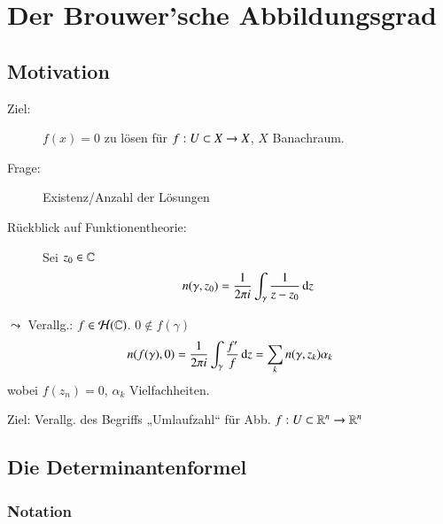 \section{Der Brouwer'sche Abbildungsgrad}

\subsection*{Motivation}
\begin{description}
    \item[Ziel:]
    $f(x)=0$ zu lösen für $f:U\subset X \rightarrow X$, $X$ Banachraum.
    \item[Frage:]
    Existenz/Anzahl der Lösungen
    \item[Rückblick auf Funktionentheorie:]
    Sei $z_0\in \mathbb{C}$
    \[
        n(\gamma,z_0) = \frac{1}{2\pi i} \int_\gamma \frac1{z-z_0} \, \mathrm{d} z
    \]
\end{description}
$\leadsto$ Verallg.: $f\in \mathcal H(\mathbb{C})$. $0\nin f(\gamma)$
\[
    n(f(\gamma),0)=\frac1{2\pi i} \int_\gamma \frac{f'}{f} \, \mathrm{d} z = \sum_k n(\gamma,z_k) \alpha_k
\]
wobei $f(z_n)=0$, $\alpha_k$ Vielfachheiten.

\noindent Ziel: Verallg. des Begriffs „Umlaufzahl“ für Abb. $f:U\subset \mathbb{R}^n\rightarrow \mathbb{R}^n$

\subsection{Die Determinantenformel}

\subsubsection{Notation}

